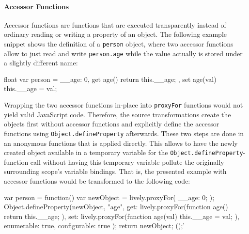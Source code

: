 \paragraph{Accessor Functions}
Accessor functions are functions that are executed transparently instead of ordinary reading or writing a property of an object.
The following example snippet shows the definition of a \lstinline{person} object, where two accessor functions allow to just read and write \lstinline{person.age} while the value actually is stored under a slightly different name:

\begin{code}{}{float}
var person = {
    __age: 0,
    get age() {
        return this.__age;
    },
    set age(val) {
        this.__age = val;
    }
}
\end{code}
\iffalse
\end{verbatim}\fi

Wrapping the two accessor functions in-place into \lstinline{proxyFor} functions would not yield valid JavaScript code.
Therefore, the source transformations create the objects first without accessor functions and explicitly define the accessor functions using \lstinline{Object.defineProperty} afterwards.
These two steps are done in an anonymous functions that is applied directly.
This allows to have the newly created object available in a temporary variable for the \lstinline{Object.defineProperty}-function call without having this temporary variable pollute the originally surrounding scope's variable bindings.
That is, the presented example with accessor functions would be transformed to the following code: \\

\begin{code}{}{}
var person = function() {
    var newObject = lively.proxyFor({
        __age: 0;
    });
    Object.defineProperty(newObject, "age", {
        get: lively.proxyFor(function age() {
            return this.__age;
        }),
        set: lively.proxyFor(function age(val) {
            this.__age = val;
        }),
        enumerable: true,
        configurable: true
    });
    return newObject;
}();'
\end{code}
\iffalse
\end{verbatim}\fi

